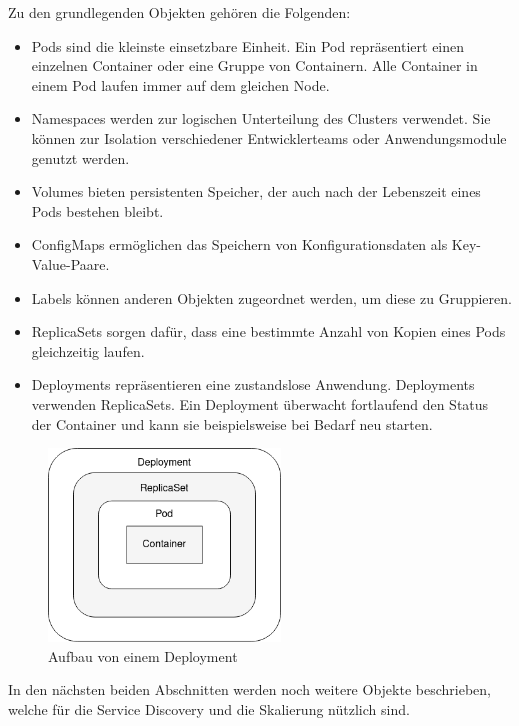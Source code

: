 Zu den grundlegenden Objekten gehören die Folgenden:
\begin{itemize}
\item Pods sind die kleinste einsetzbare Einheit. Ein Pod repräsentiert einen einzelnen Container oder eine Gruppe von Containern. Alle Container in einem Pod laufen immer auf dem gleichen Node.
\item Namespaces werden zur logischen Unterteilung des Clusters verwendet. Sie können zur Isolation verschiedener Entwicklerteams oder Anwendungsmodule genutzt werden.
\item Volumes bieten persistenten Speicher, der auch nach der Lebenszeit eines Pods bestehen bleibt.
\item ConfigMaps ermöglichen das Speichern von Konfigurationsdaten als Key-Value-Paare.
\item Labels können anderen Objekten zugeordnet werden, um diese zu Gruppieren.
\item ReplicaSets sorgen dafür, dass eine bestimmte Anzahl von Kopien eines Pods gleichzeitig laufen.
\item Deployments repräsentieren eine zustandslose Anwendung. Deployments verwenden ReplicaSets. Ein Deployment überwacht fortlaufend den Status der Container und kann sie beispielsweise bei Bedarf neu starten.
\end{itemize}

\begin{figure}[H] 
    \centering
    \includegraphics[width=0.55\textwidth]{figures/KubernetesDeployment.png}
    \caption{Aufbau von einem Deployment}
\end{figure}

In den nächsten beiden Abschnitten werden noch weitere Objekte beschrieben, welche für die Service Discovery und die Skalierung nützlich sind.

